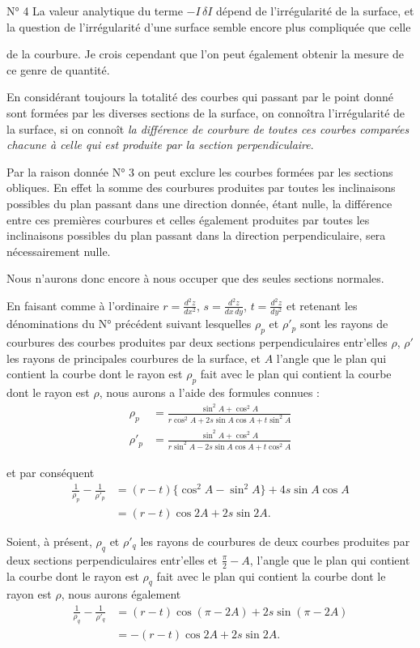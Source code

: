 \documentclass[11pt,a4paper]{article}
\begin{document}
N° 4 La valeur analytique du terme $-I\,\delta I$ dépend de l'irrégularité de
la surface, et la question de l'irrégularité d'une surface semble encore plus
compliquée que celle

de la courbure. Je crois cependant que l'on peut également obtenir la mesure
de ce genre de quantité.

En considérant toujours la totalité des courbes qui passant par le point donné
sont formées par les diverses sections de la surface, on connoîtra
l'irrégularité de la surface, si on connoît \emph{la différence de courbure de
toutes ces courbes comparées chacune à celle qui est produite par la section
perpendiculaire}.

Par la raison donnée N° 3 on peut exclure les courbes formées par les sections
obliques. En effet la somme des courbures produites par toutes les
inclinaisons possibles du plan passant dans une direction donnée, étant nulle,
la différence entre ces premières courbures et celles également produites par
toutes les inclinaisons possibles du plan passant dans la direction
perpendiculaire, sera nécessairement nulle.

Nous n'aurons donc encore à nous occuper que des seules sections normales.

En faisant comme à l'ordinaire $r = \frac{d^2 z}{dx^2}$,
$s = \frac{d^2 z}{dx\,dy}$, $t = \frac{d^2 z}{dy^2}$ et retenant les
dénominations du N° précédent suivant lesquelles $\rho_p$ et $\rho'_p$ sont
les rayons de courbures des courbes produites par deux sections
perpendiculaires entr'elles $\rho$, $\rho'$ les rayons de principales
courbures de la surface, et $A$ l'angle que le plan qui contient la courbe
dont le rayon est $\rho_p$ fait avec le plan qui contient la courbe dont le
rayon est $\rho$, nous aurons a l'aide des formules connues :
\begin{align*}
  \rho_p &= \frac{\sin^2 A + \cos^2 A}
    {r\cos^2 A + 2s\sin A\cos A + t\sin^2 A} \\
  \rho'_p &= \frac{\sin^2 A + \cos^2 A}
    {r\sin^2 A - 2s\sin A\cos A + t\cos^2 A}
\end{align*}

et par conséquent
\begin{align*}
  \frac{1}{\rho_p} - \frac{1}{\rho'_p}
   &= (r-t)\{\cos^2 A - \sin^2 A\} + 4s\sin A\cos A \\
   &= (r-t)\cos 2A + 2s\sin 2A .
\end{align*}

Soient, à présent, $\rho_q$ et $\rho'_q$ les rayons de courbures de deux
courbes produites par deux sections perpendiculaires entr'elles et
$\frac{\pi}{2} - A$, l'angle que le plan qui contient la courbe dont le rayon
est $\rho_q$ fait avec le plan qui contient la courbe dont le rayon est
$\rho$, nous aurons également
\begin{align*}
  \frac{1}{\rho_q} - \frac{1}{\rho'_q}
   &= (r-t)\cos(\pi-2A) + 2s\sin(\pi-2A) \\
   &= -(r-t)\cos 2A + 2s\sin 2A .
\end{align*}
\end{document}
